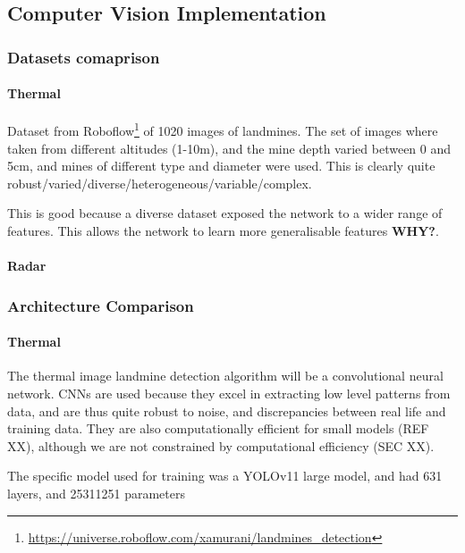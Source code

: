 \subsection{Computer Vision Implementation} \label{compvis_implementation}

\subsubsection{Datasets comaprison}

    \paragraph{Thermal}Dataset from Roboflow\footnote{\url{https://universe.roboflow.com/xamurani/landmines_detection}} of 1020 images of landmines. The set of images where taken from different altitudes (1-10m), and the mine depth varied between 0 and 5cm, and mines of different type and diameter were used. This is clearly quite robust/varied/diverse/heterogeneous/variable/complex.
    
    This is good because a diverse dataset exposed the network to a wider range of features. This allows the network to learn more generalisable features \textbf{WHY?}.
    
    \paragraph{Radar}

\subsubsection{Architecture Comparison}

    \paragraph{Thermal} The thermal image landmine detection algorithm will be a  convolutional neural network. CNNs are used because they excel in extracting low level patterns from data, and are thus quite robust to noise, and discrepancies between real life and training data. They are also computationally efficient for small models (REF XX), although we are not constrained by computational efficiency (SEC XX).
    
    The specific model used for training was a YOLOv11 large model, and had 631 layers, and  25311251 parameters
    
